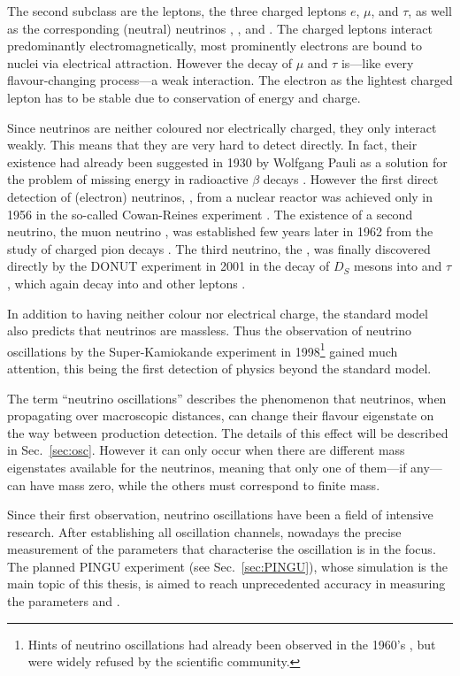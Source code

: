 The second subclass are the leptons, the three charged leptons $e$, $\mu$, and
$\tau$, as well as the corresponding (neutral) neutrinos \nue, \numu, and
\nutau. The charged leptons interact predominantly electromagnetically, most
prominently electrons are bound to nuclei via electrical attraction. However
the decay of $\mu$ and $\tau$ is---like every flavour-changing process---a weak
interaction. The electron as the lightest charged lepton has to be stable due
to conservation of energy and charge.

Since neutrinos are neither coloured nor electrically charged, they only
interact weakly. This means that they are very hard to detect directly. In
fact, their existence had already been suggested in 1930 by Wolfgang Pauli as a
solution for the problem of missing energy in radioactive $\beta$ decays
\cite{PauliBeta}. However the first direct detection of (electron) neutrinos,
\nue, from a nuclear reactor was achieved only in 1956 in the so-called
Cowan-Reines experiment \cite{CowanReines}. The existence of a second neutrino,
the muon neutrino \numu, was established few years later in 1962 from the study
of charged pion decays \cite{NuMuDiscovery}. The third neutrino, the \nutau,
was finally discovered directly by the DONUT experiment in 2001 in the decay of
$D_S$ mesons into \nutaubar and $\tau$, which again decay into \nutau and other
leptons \cite{DONUT}.

In addition to having neither colour nor electrical charge, the standard model
also predicts that neutrinos are massless. Thus the observation of neutrino
oscillations by the Super-Kamiokande experiment in 1998\footnote{Hints of
neutrino oscillations had already been observed in the 1960's
\cite{DaviesNuOsc}, but were widely refused by the scientific community.}
\cite{SuperKosc} gained much attention, this being the first detection of
physics beyond the standard model.

The term ``neutrino oscillations'' describes the phenomenon that neutrinos,
when propagating over macroscopic distances, can change their flavour
eigenstate on the way between production detection. The details of this effect
will be described in Sec.~\ref{sec:osc}. However it can only occur when there
are different mass eigenstates available for the neutrinos, meaning that only
one of them---if any---can have mass zero, while the others must correspond to
finite mass.

Since their first observation, neutrino oscillations have been a field of
intensive research. After establishing all oscillation channels, nowadays the
precise measurement of the parameters that characterise the oscillation is in
the focus. The planned PINGU experiment (see Sec.~\ref{sec:PINGU}), whose
simulation is the main topic of this thesis, is aimed to reach unprecedented
accuracy in measuring the parameters  and .


